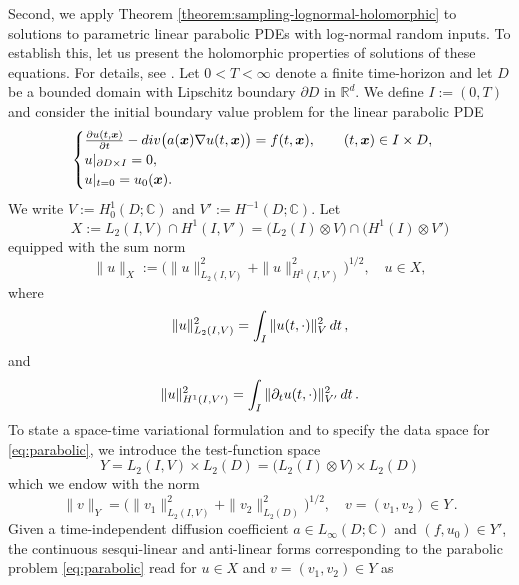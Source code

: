 \documentclass[11pt]{article}
\numberwithin{equation}{section}
\theoremstyle{definition}
\theoremstyle{remark}
\newcommand{\bx}{{\boldsymbol{x}}}
\newcommand{\rd}{{\rm d}}
\def\RR{{\mathbb R}}
\def\CC{{\mathbb C}}
\def\CC{{\mathbb C}}
\def\RR{{\mathbb R}}
\def\CC{{\mathbb C}}
\begin{document}
{Second, we apply Theorem \ref{theorem:sampling-lognormal-holomorphic} to solutions to parametric linear parabolic PDEs with log-normal random inputs. {To  establish this, let us  present the holomorphic properties of solutions of these equations.  For details, see \cite[Section 4.3.2]{DNSZ2023}.} 
 Let $0<T<\infty$ denote a finite time-horizon and let $D$ be a
 bounded domain with Lipschitz boundary $\partial D$ in $\RR^d$. We
 define $I:=(0,T)$ and consider the initial boundary value problem
 for the linear parabolic PDE 
\begin{equation}\label{eq:parabolic}
 	\begin{cases}
 		\frac{\partial u(t,\bx)}{\partial t} 
 		- {\rm div}\big(a(\bx)\nabla u(t,\bx)\big)=f(t,\bx), \qquad (t,\bx)\in I\times D,
 		\\
 		u|_{\partial D\times I}=0,
 		\\
 		u|_{t=0}=u_0(\bx).
 	\end{cases}
 \end{equation}
We write $V:=H_0^1(D;\CC)$ and $V':=H^{-1}(D;\CC)$. Let
\begin{equation} \label{X:=}
 	X := L_2(I,V)\cap H^1(I,V') = \big(L_2(I)\otimes V \big)\cap \big(H^1(I)\otimes V'\big)
 \end{equation}
 equipped with the sum norm
 \begin{equation}\label{normX:=}
 	\|u\|_{X} := \Big(\|u\|_{L_2(I,V)}^2 +\|u\|_{H^1(I,V')}^2 \Big)^{1/2},\quad u\in X,
 \end{equation}
 where
 $$
 \|u\|_{L_2(I,V)}^2 = \int_I \|u(t, \cdot) \|_V^2\, \rd t\, ,
 $$
 and
 $$
 \|u\|_{H^1(I,V')}^2 = \int_I \| \partial_t u(t, \cdot) \|_{V'}^2\, \rd
 t\,.
 $$
 To state a space-time variational formulation and to specify the data
 space for \eqref{eq:parabolic}, we introduce the test-function space
\begin{equation*}\label{eq:ParIBVPY}
 	Y 
 	= L_2(I,V)\times L_2(D) 
 	= \big(L_2(I)\otimes V \big) \times L_2(D)
 \end{equation*}
which we endow with the norm
\begin{equation*}
 	\|v\|_{Y}
 	=
 	\Big(\|v_1\|_{L_2(I,V)}^2 + \|v_2\|_{L_2(D)}^2\Big)^{1/2},\quad v=(v_1,v_2)\in Y\,.
 \end{equation*}
 Given a time-independent diffusion coefficient $a\in L_\infty(D;\CC)$
 and $(f,u_0)\in Y'$, the continuous sesqui-linear and anti-linear forms
 corresponding to the parabolic problem \eqref{eq:parabolic} read for
 $u\in X$ and $v=(v_1,v_2)\in Y$ as
 \begin{equation*}

\end{equation*}}
\end{document}
